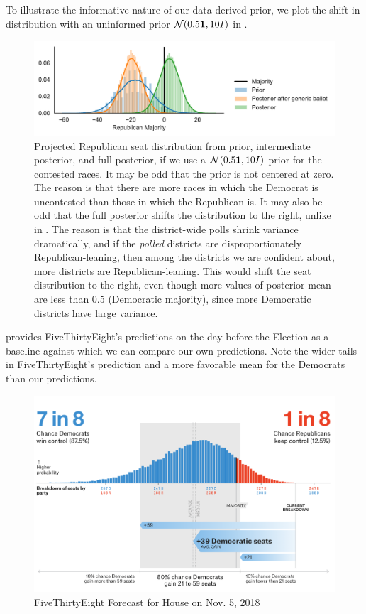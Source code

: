 \documentclass[11pt]{article}
\begin{document}
To illustrate the informative nature of our data-derived prior, we plot the shift in distribution with an uninformed prior $\mathcal{N}(0.5\bm{1}, 10I)$ in .

\begin{figure}[tbh]
  \centering
  \includegraphics[width=\textwidth]{rep_seats_with_diffused_prior.pdf}
  \caption{Projected Republican seat distribution from prior, intermediate posterior, and full posterior, if we use a $\mathcal{N}(0.5\bm{1}, 10I)$ prior for the contested races. It may be odd that the prior is not centered at zero. The reason is that there are more races in which the Democrat is uncontested than those in which the Republican is. It may also be odd that the full posterior shifts the distribution to the right, unlike in . The reason is that the district-wide polls shrink variance dramatically, and if the \emph{polled} districts are disproportionately Republican-leaning, then among the districts we are confident about, more districts are Republican-leaning. This would shift the seat distribution to the right, even though more values of posterior mean are less than $0.5$ (Democratic majority), since more Democratic districts have large variance.}
  \label{fig:hists_diffuse}
\end{figure}

 provides FiveThirtyEight's predictions on the day before the Election as a baseline against which we can compare our own predictions. Note the wider tails in FiveThirtyEight's prediction and a more favorable mean for the Democrats than our predictions.

\begin{figure}[tbh]
  \centering
  \includegraphics[scale=0.4]{538_hist}
  \caption{FiveThirtyEight Forecast for House on Nov. 5, 2018}
  \label{fig:538_hist}
\end{figure}
\end{document}
